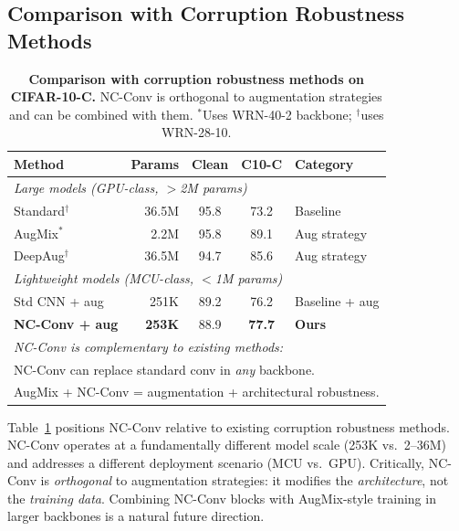 \documentclass[10pt,twocolumn,letterpaper]{article}
\begin{document}
\subsection{Comparison with Corruption Robustness Methods}
\label{sec:sota}

\begin{table}[t]
\centering
\caption{\textbf{Comparison with corruption robustness methods on CIFAR-10-C.} NC-Conv is orthogonal to augmentation strategies and can be combined with them. $^*$Uses WRN-40-2 backbone; $^\dagger$uses WRN-28-10.}
\label{tab:sota}
\footnotesize
\setlength{\tabcolsep}{3pt}
\begin{tabular}{@{}lrccl@{}}
\toprule
\textbf{Method} & \textbf{Params} & \textbf{Clean} & \textbf{C10-C} & \textbf{Category} \\
\midrule
\multicolumn{5}{l}{\textit{Large models (GPU-class, $>$2M params)}} \\
Standard$^\dagger$ & 36.5M & 95.8 & 73.2 & Baseline \\
AugMix$^*$~\cite{hendrycks2020augmix} & 2.2M & 95.8 & 89.1 & Aug strategy \\
DeepAug$^\dagger$~\cite{hendrycks2021deepaugment} & 36.5M & 94.7 & 85.6 & Aug strategy \\
\midrule
\multicolumn{5}{l}{\textit{Lightweight models (MCU-class, $<$1M params)}} \\
Std CNN + aug & 251K & 89.2 & 76.2 & Baseline + aug \\
\textbf{NC-Conv + aug} & \textbf{253K} & 88.9 & \textbf{77.7} & \textbf{Ours} \\
\midrule
\multicolumn{5}{l}{\textit{NC-Conv is complementary to existing methods:}} \\
\multicolumn{5}{l}{\quad NC-Conv can replace standard conv in \emph{any} backbone.} \\
\multicolumn{5}{l}{\quad AugMix + NC-Conv = augmentation + architectural robustness.} \\
\bottomrule
\end{tabular}
\end{table}

Table~\ref{tab:sota} positions NC-Conv relative to existing corruption robustness methods.
NC-Conv operates at a fundamentally different model scale (253K vs.\ 2--36M) and addresses a different deployment scenario (MCU vs.\ GPU).
Critically, NC-Conv is \emph{orthogonal} to augmentation strategies: it modifies the \emph{architecture}, not the \emph{training data}.
Combining NC-Conv blocks with AugMix-style training in larger backbones is a natural future direction.
\end{document}
